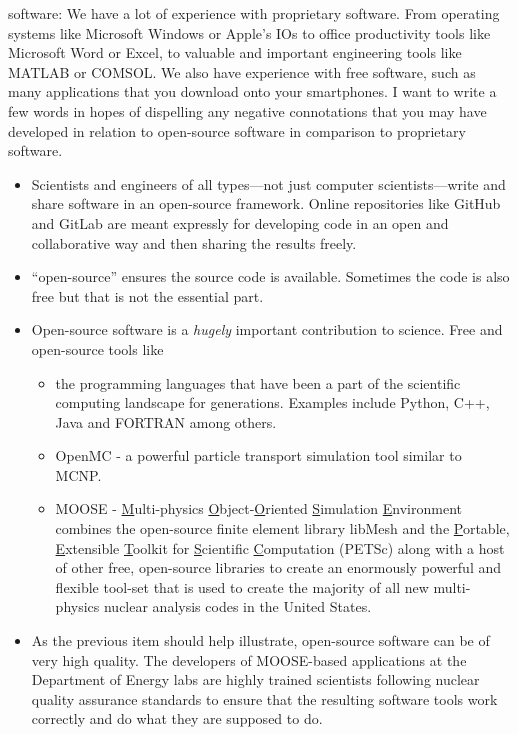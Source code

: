  software:
We have a lot of experience with proprietary software. From operating systems like Microsoft Windows or Apple's IOs to office productivity tools like Microsoft Word or Excel, to valuable and important engineering tools like MATLAB or COMSOL.  We also have experience with free software, such as many applications that you download onto your smartphones.  I want to write a few words in hopes of dispelling any negative connotations that you may have developed in relation to open-source software in comparison to proprietary software.
\begin{itemize}
\item Scientists and engineers of all types---not just computer scientists---write and share software in an open-source framework.  Online repositories like GitHub and GitLab are meant expressly for developing code in an open and collaborative way and then sharing the results freely.
\item ``open-source'' ensures the source code is available.  Sometimes the code is also free but that is not the essential part.

\item Open-source software is a \emph{hugely} important contribution to science.  Free and open-source tools like
\begin{itemize}
\item the programming languages that have been a part of the scientific computing landscape for generations.  Examples include Python, C++, Java and FORTRAN among others.
\item OpenMC\cite{ROMANO201590} - a powerful particle transport simulation tool similar to MCNP.
\item MOOSE - \underline{M}ulti-physics \underline{O}bject-\underline{O}riented \underline{S}imulation \underline{E}nvironment\cite{lindsay2022moose} combines the open-source finite element library libMesh\cite{kirk2006libmesh} and the \underline{P}ortable, \underline{E}xtensible \underline{T}oolkit for \underline{S}cientific \underline{C}omputation (PETSc)\cite{petsc-user-ref} along with a host of other free, open-source libraries to create an enormously powerful and flexible tool-set that is used to create the majority of all new multi-physics nuclear analysis codes in the United States.
\end{itemize} 
\item As the previous item should help illustrate, open-source software can be of very high quality.  The developers of MOOSE-based applications at the Department of Energy labs are highly trained scientists following nuclear quality assurance standards to ensure that the resulting software tools work correctly and do what they are supposed to do. 
\end{itemize}
